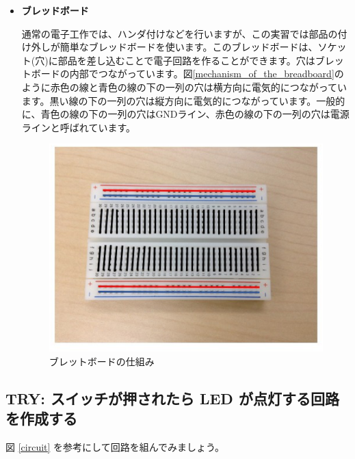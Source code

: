 \documentclass[11pt,a4paper]{jarticle}
\begin{document}
\begin{itemize}
 \item \textbf{ブレッドボード} 
 
通常の電子工作では、ハンダ付けなどを行いますが、この実習では部品の付け外しが簡単なブレッドボードを使います。このブレッドボードは、ソケット(穴)に部品を差し込むことで電子回路を作ることができます。穴はブレットボードの内部でつながっています。図\ref{mechanism_of_the_breadboard}のように赤色の線と青色の線の下の一列の穴は横方向に電気的につながっています。黒い線の下の一列の穴は縦方向に電気的につながっています。一般的に、青色の線の下の一列の穴はGNDライン、赤色の線の下の一列の穴は電源ラインと呼ばれています。

\begin{figure}[htb]
  \centering
  \includegraphics[width=1.0\columnwidth]{img/mechanism_of_the_breadboard.eps}
  \caption{ブレットボードの仕組み}
  \label{figure:mechanism_of_the_breadboard}
\end{figure}
       
\end{itemize}

\setcounter{nombre}{1}
\subsection*{TRY\thenombre: スイッチが押されたら LED が点灯する回路を作成する}
\label{base}

図 \ref{circuit} を参考にして回路を組んでみましょう。
\end{document}
